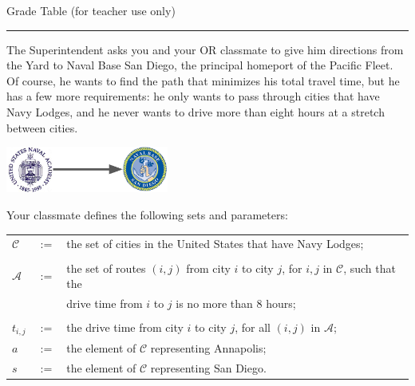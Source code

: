 \documentclass[12pt]{exam}
\begin{document}
\begin{center}
Grade Table (for teacher use only)\\
\addpoints
\gradetable[v][questions]
\end{center}

\noindent
\rule[2ex]{\textwidth}{2pt}

\newpage %


\begin{questions}

\question \label{ques:shortestpath} The Superintendent asks you and your OR classmate to give him directions from the Yard to Naval Base San Diego, the principal homeport of the Pacific Fleet. 
Of course, he wants to find the path that minimizes his total travel time, but he has a few more requirements: he only wants to pass through cities that have Navy Lodges, and he never wants to drive more than eight hours at a stretch between cities. 

\begin{center} 
\includegraphics[width = 0.4\textwidth]{usna_to_nbsd}
\end{center}

\smallskip

Your classmate defines the following sets and parameters:

\bigskip
\renewcommand{\arraystretch}{1}
\begin{tabular}{lcl}
$\mathcal{C}$ & $:=$ & the set of cities in the United States that have Navy Lodges; \\
\\
$\mathcal{A}$ & $:=$ & the set of routes $(i,j)$ from city $i$ to city $j$, for $i, j$ in $\mathcal{C}$, such that the \\
&& drive time from $i$ to $j$ is no more than 8 hours; \\
\\
$t_{i,j}$ & $:=$ & the drive time from city $i$ to city $j$, for all $(i,j)$ in $\mathcal{A}$;\\
$a$ & $:=$ & the element of $\mathcal{C}$ representing Annapolis;\\
$s$ & $:=$ & the element of $\mathcal{C}$ representing San Diego.\\
\end{tabular}


\end{questions}
\end{document}
